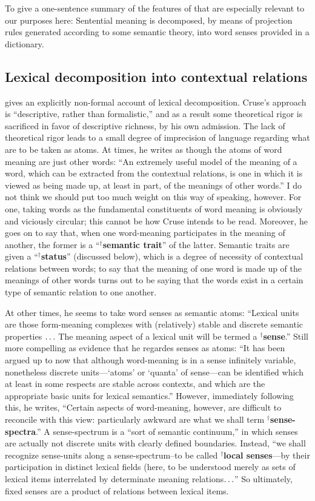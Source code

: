 \documentclass[12pt]{amsart}
\begin{document}
To give a one-sentence summary of the features of \cite{fodor_structure_1963} that are especially relevant to our purposes here: Sentential meaning is decomposed, by means of projection rules generated according to some semantic theory, into word senses provided in a dictionary.

\subsection{Lexical decomposition into contextual relations}

\cite{cruse_lexical_1986} gives an explicitly non-formal account of lexical decomposition. Cruse's approach is ``descriptive, rather than formalistic,'' and as a result some theoretical rigor is sacrificed in favor of descriptive richness, by his own admission. The lack of theoretical rigor leads to a small degree of imprecision of language regarding what are to be taken as atoms. At times, he writes as though the atoms of word meaning are just other words: ``An extremely useful model of the meaning of a word, which can be extracted from the contextual relations, is one in which it is viewed as being made up, at least in part, of the meanings of other words.'' I do not think we should put too much weight on this way of speaking, however. For one, taking words as the fundamental constituents of word meaning is obviously and viciously circular; this cannot be how Cruse intends to be read. Moreover, he goes on to say that, when one word-meaning participates in the meaning of another, the former is a ``$^\dagger${\bf semantic trait}'' of the latter. Semantic traits are given a ``$^\dagger${\bf status}'' (discussed below), which is a degree of necessity of contextual relations between words; to say that the meaning of one word is made up of the meanings of other words turns out to be saying that the words exist in a certain type of semantic relation to one another.

At other times, he seems to take word senses as semantic atoms: ``Lexical units are those form-meaning complexes with (relatively) stable and discrete semantic properties $\mathellipsis$ The meaning aspect of a lexical unit will be termed a $^\dagger${\bf sense}.'' Still more compelling as evidence that he regardes senses as atoms: ``It has been argued up to now that although word-meaning is in a sense infinitely variable, nonetheless discrete units---`atoms' or `quanta' of sense---can be identified which at least in some respects are stable across contexts, and which are the appropriate basic units for lexical semantics.'' However, immediately following this, he writes, ``Certain aspects of word-meaning, however, are difficult to reconcile with this view: particularly awkward are what we shall term $^\dagger${\bf sense-spectra}.'' A sense-spectrum is a ``sort of semantic continuum,'' in which senses are actually not discrete units with clearly defined boundaries. Instead, ``we shall recognize sense-units along a sense-spectrum--to be called $^\dagger${\bf local senses}---by their participation in distinct lexical fields (here, to be understood merely as sets of lexical items interrelated by determinate meaning relations$\mathellipsis$'' So ultimately, fixed senses are a product of relations between lexical items.
\end{document}
